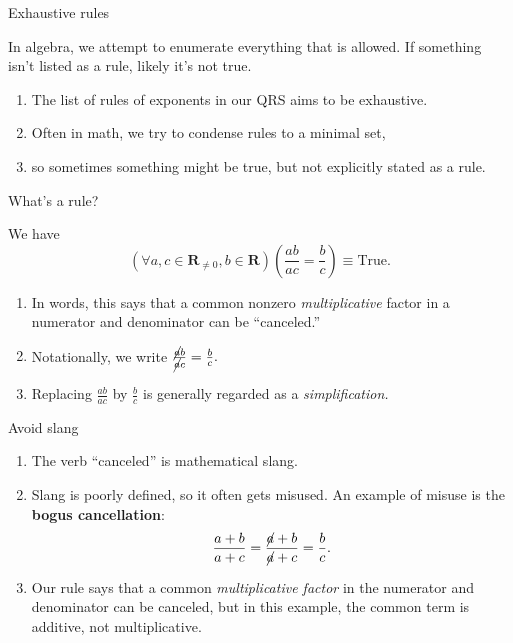 \documentclass[portrait,fleqn,12pt]{beamer}
\newcommand{\reals}{\mathbf{R}}
\newenvironment{handlist}
   {\begin{enumerate}[\faHandPointRight]
       \addtolength{\itemsep}{0.0\itemsep}}
     {\end{enumerate}}
\begin{document}
\begin{frame}{Exhaustive rules}

In algebra, we attempt to enumerate everything that is allowed. If something isn't listed as a rule, likely it's not true.

\begin{handlist}
\item The list of rules of exponents in our QRS aims to be exhaustive.

\item  Often in math, we try  to condense rules to a minimal set, 

\item so sometimes something might be true, but not explicitly stated as a rule.
\end{handlist}

\end{frame}



\begin{frame}{What's a  rule?}

\begin{theorem} We have 
\begin{equation*} 
   \left(\forall a, c\in \reals_{\neq 0}, b \in \reals \right)\left(\frac{a b}{a c} = \frac{b}{c} \right) \equiv \text{True}.
  \end{equation*}
\end{theorem}

\begin{handlist}
\item In words, this says that a common nonzero \emph{multiplicative} factor in a numerator and denominator can be ``canceled.''
\item Notationally, we write 
$
\frac{\cancel{a} b}{ \cancel{a} c}  = \frac{b}{c}.
$
\item Replacing $\frac{a b}{a c}$ by $\frac{b}{c}$ is generally regarded as a \emph{simplification.}

\end{handlist}

\end{frame}

\begin{frame}{Avoid slang}

\begin{handlist}

\item The verb ``canceled''  is mathematical slang.  
\item Slang is poorly defined, so it  often gets misused. An example of misuse is the \textbf{bogus cancellation}:
\begin{equation*}
   \frac{a+b}{a+c} =  \frac{\cancel{a}+b}{\cancel{a} +c} = \frac{b}{c}.
\end{equation*}
\item Our rule says that a common \emph{multiplicative factor} in the numerator and denominator can be canceled, but in this example, the common term is additive, not multiplicative.
\end{handlist}

\end{frame}
\end{document}
